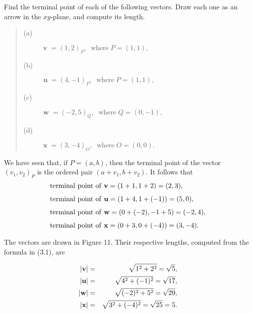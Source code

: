 \begin{example} Find the terminal point of each of the following vectors. Draw each one as an arrow in the $xy$-plane, and compute its length.
 
\begin{quote}
\begin{description}
\item[(a)] $\textbf{v}\; = (1, 2)_P,  \;\;\mathrm{where}\; P = (1, 1),$
\item[(b)] $\textbf{u}\; = (4, -1)_P, \;\;\mathrm{where}\;  P = (1, 1),$
\item[(c)] $\textbf{w}\; = (-2, 5)_Q,\;\;\mathrm{where}\;  Q = (0, -1),$
\item[(d)] $\textbf{x}\; = (3, -4)_O, \;\;\mathrm{where}\;  O = (0, 0).$

\end{description}
\end{quote} 
\noindent We have seen that, if $P = (a, b)$, then the terminal point of the vector $(v_1, v_2)_P$ is the ordered pair $(a + v_1, b + v_2)$. It follows that 
$$
\begin{array}{l}
\mathrm{terminal~point~of~\bf{v}} = (1 + 1, 1 + 2) = (2, 3), \vspace{.1in}\\
\mathrm{terminal~point~of~\bf{u}} = (1 + 4, 1 + (-1)) = (5, 0), \vspace{.1in}\\
\mathrm{terminal~point~of~\bf{w}} = (0 + (-2), -1 + 5 ) = (-2, 4),\vspace{.1in}\\
\mathrm{terminal~point~of~\bf{x}}  = (0 + 3, 0 + (-4)) = (3, -4).
\end{array}
$$

\noindent The vectors are drawn in Figure 11. Their respective lengths, computed from the formula in (3.1), are
 
\begin{eqnarray*} 
|\mbox{\bf{v}}|  &=& \sqrt{1^2 + 2^2} = \sqrt{5}, \vspace{.1in}\\
|\mbox{\bf{u}}|  &=& \sqrt{4^2 + (-1)^2} = \sqrt{17}, \vspace{.1in}\\
|\mbox{\bf{w}}|  &=& \sqrt{(-2)^2 + 5^2} = \sqrt{29},\vspace{.1in}\\
|\mbox{\bf{x}}|  &=& \sqrt{3^2 + (-4)^2}  = \sqrt{25} = 5.
\end{eqnarray*}
\end{example}

